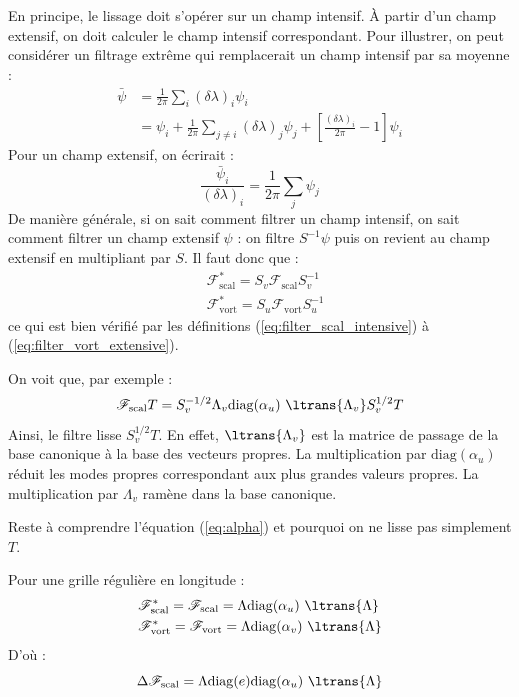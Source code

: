 \documentclass[a4paper,english,french]{article}
\begin{document}
En principe, le lissage doit s'opérer sur un champ intensif. \`A
partir d'un champ extensif, on doit calculer le champ intensif
correspondant. Pour illustrer, on peut considérer un filtrage extrême
qui remplacerait un champ intensif par sa moyenne :
\begin{align*}
  \bar \psi & = \frac{1}{2 \pi} \sum_i (\delta \lambda)_i \psi_i \\
  & = \psi_i + \frac{1}{2 \pi} \sum_{j \ne i} (\delta \lambda)_j \psi_j
  + \left[\frac{ (\delta \lambda)_i}{2 \pi} - 1\right] \psi_i
\end{align*}
Pour un champ extensif, on écrirait :
\begin{equation*}
  \frac{\bar \psi_i}{(\delta \lambda)_i} = \frac{1}{2 \pi}\sum_j \psi_j
\end{equation*}
De manière générale, si on sait comment filtrer un champ intensif, on
sait comment filtrer un champ extensif $\psi$ : on filtre $S^{-1}
\psi$ puis on revient au champ extensif en multipliant par $S$. Il
faut donc que :
\begin{align*}
  & \mathscr{F}^*_\mathrm{scal} = S_v \mathscr{F}_\mathrm{scal} S_v^{-1} \\
  & \mathscr{F}^*_\mathrm{vort} = S_u \mathscr{F}_\mathrm{vort} S_u^{-1}
\end{align*}
ce qui est bien vérifié par les définitions
(\ref{eq:filter_scal_intensive}) à (\ref{eq:filter_vort_extensive}).

On voit que, par exemple :
\begin{equation*}
  \mathscr{F}_\mathrm{scal} T
  =
  S_v^{-1/2} \Lambda_v \mathrm{diag}(\alpha_u)\ \ltrans{\Lambda_v} S_v^{1/2} T
\end{equation*}
Ainsi, le filtre lisse $S_v^{1/2} T$. En effet, $\ltrans{\Lambda_v}$
est la matrice de passage de la base canonique à la base des vecteurs
propres. La multiplication par $\mathrm{diag}(\alpha_u)$ réduit les
modes propres correspondant aux plus grandes valeurs propres. La
multiplication par $\Lambda_v$ ramène dans la base canonique.

Reste à comprendre l'équation (\ref{eq:alpha}) et pourquoi on ne lisse
pas simplement $T$.

Pour une grille régulière en longitude :
\begin{align*}
  & \mathscr{F}^*_\mathrm{scal} = \mathscr{F}_\mathrm{scal}
  = \Lambda \mathrm{diag}(\alpha_u)\ \ltrans{\Lambda} \\
  & \mathscr{F}^*_\mathrm{vort} = \mathscr{F}_\mathrm{vort}
  = \Lambda \mathrm{diag}(\alpha_v)\ \ltrans{\Lambda}
\end{align*}
D'où :
\begin{equation*}
  \Delta \mathscr{F}_\mathrm{scal}
  = \Lambda \mathrm{diag}(e) \mathrm{diag}(\alpha_u)\ \ltrans{\Lambda}
\end{equation*}
\end{document}
